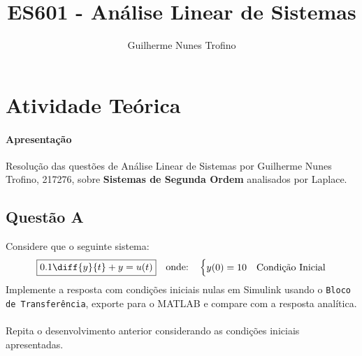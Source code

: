 \documentclass{article}
\title{ES601 - Análise Linear de Sistemas}
\author{Guilherme Nunes Trofino}
\begin{document}
    \maketitle
\newpage

    \section{Atividade Teórica}
        \paragraph{Apresentação}Resolução das questões de Análise Linear de Sistemas por Guilherme Nunes Trofino, 217276, sobre \textbf{Sistemas de Segunda Ordem} analisados por Laplace.

        \subsection{Questão A}
            \begin{exercise}
                Considere que o seguinte sistema:
                    \begin{equation}
                        \boxed{
                            0.1\diff{y}{t} + y = u(t)
                        }
                        \quad
                        \text{onde:}
                        \quad
                        \begin{cases}
                            y(0) = 10 & \text{Condição Inicial}\\
                        \end{cases}
                    \end{equation}
                Implemente a resposta com condições iniciais nulas em Simulink usando o \texttt{Bloco de Transferência}, exporte para o MATLAB e compare com a resposta analítica.
                \\\\
                Repita o desenvolvimento anterior considerando as condições iniciais apresentadas.
            \end{exercise}
\end{document}
